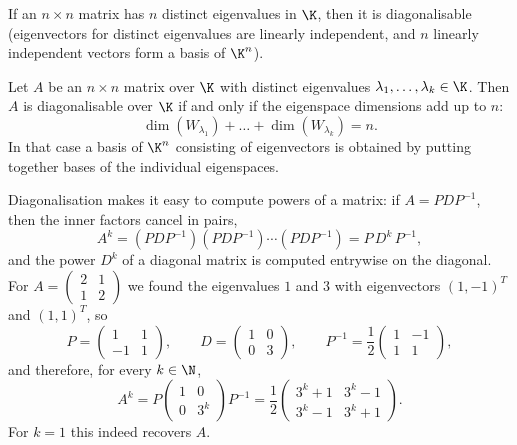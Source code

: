 \begin{corollary}
If an $n\times n$ matrix has $n$ distinct eigenvalues in $\K$, then it is diagonalisable (eigenvectors for
distinct eigenvalues are linearly independent, and $n$ linearly independent vectors form a basis of $\K^n$).
\end{corollary}

\begin{theorem}
Let $A$ be an $n\times n$ matrix over $\K$ with distinct eigenvalues $\lambda_1,\ldots,\lambda_k\in\K$.
Then $A$ is diagonalisable over $\K$ if and only if the eigenspace dimensions add up to $n$:
\[
\dim(W_{\lambda_1}) + \ldots + \dim(W_{\lambda_k}) = n.
\]
In that case a basis of $\K^n$ consisting of eigenvectors is obtained by putting together bases of the
individual eigenspaces.
\end{theorem}

\begin{example}
Diagonalisation makes it easy to compute powers of a matrix: if $A = P D P^{-1}$, then the inner factors
cancel in pairs,
\[
A^k = (PDP^{-1})(PDP^{-1})\cdots (PDP^{-1}) = P\, D^k\, P^{-1},
\]
and the power $D^k$ of a diagonal matrix is computed entrywise on the diagonal. For
$A = \left( \begin{smallmatrix} 2 & 1\\ 1 & 2 \end{smallmatrix} \right)$ we found the eigenvalues $1$ and
$3$ with eigenvectors $(1,-1)^T$ and $(1,1)^T$, so
\[
P = \left( \begin{array}{cc} 1 & 1\\ -1 & 1 \end{array} \right), \qquad
D = \left( \begin{array}{cc} 1 & 0\\ 0 & 3 \end{array} \right), \qquad
P^{-1} = \frac12\left( \begin{array}{cc} 1 & -1\\ 1 & 1 \end{array} \right),
\]
and therefore, for every $k\in\N$,
\[
A^k = P \left( \begin{array}{cc} 1 & 0\\ 0 & 3^k \end{array} \right) P^{-1}
= \frac12 \left( \begin{array}{cc} 3^k+1 & 3^k-1\\ 3^k-1 & 3^k+1 \end{array} \right).
\]
For $k=1$ this indeed recovers $A$.
\end{example}

